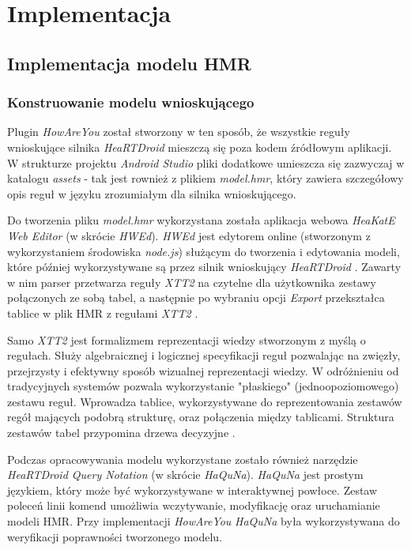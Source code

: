 \chapter{Implementacja}
\label{cha:implementacja}



\section{Implementacja modelu HMR}
\label{sec:implementacjaModeluHmr}

\subsection{Konstruowanie modelu wnioskującego}

Plugin \textit{HowAreYou} został stworzony w ten sposób, że wszystkie reguły wnioskujące silnika \textit{HeaRTDroid} mieszczą się poza kodem źródłowym aplikacji. W strukturze projektu \textit{Android Studio} pliki dodatkowe umieszcza się zazwyczaj w katalogu \textit{assets} - tak jest rownież z plikiem \textit{model.hmr}, który zawiera szczegółowy opis reguł w języku zrozumiałym dla silnika wnioskującego.

Do tworzenia pliku \textit{model.hmr} wykorzystana została aplikacja webowa \textit{HeaKatE Web Editor} (w skrócie \textit{HWEd}). \textit{HWEd} jest edytorem online (stworzonym z wykorzystaniem środowiska \textit{node.js}) służącym do tworzenia i edytowania modeli, które później wykorzystywane są przez silnik wnioskujący \textit{HeaRTDroid} \cite{heartdroid}. Zawarty w nim parser przetwarza reguły \textit{XTT2} na czytelne dla użytkownika zestawy połączonych ze sobą tabel, a następnie po wybraniu opcji \textit{Export} przekształca tablice w plik HMR z regułami \textit{XTT2} \cite{heartdroid}.

Samo \textit{XTT2} jest formalizmem reprezentacji wiedzy stworzonym z myślą o regułach. Służy algebraicznej i logicznej specyfikacji reguł pozwalając na zwięzły, przejrzysty i efektywny sposób wizualnej reprezentacji wiedzy. W odróżnieniu od tradycyjnych systemów pozwala wykorzystanie "płaskiego" (jednoopoziomowego) zestawu reguł. Wprowadza tablice, wykorzystywane do reprezentowania zestawów regół mających podobrą strukturę, oraz połączenia między tablicami. Struktura zestawów tabel przypomina drzewa decyzyjne \cite{AiWikiHekate}.

Podczas opracowywania modelu wykorzystane zostało również narzędzie \textit{HeaRTDroid Query Notation} (w skrócie \textit{HaQuNa}). \textit{HaQuNa} jest prostym językiem, który może być wykorzystywane w interaktywnej powłoce. Zestaw poleceń linii komend umożliwia wczytywanie, modyfikację oraz uruchamianie modeli HMR\cite{heartdroid}. Przy implementacji \textit{HowAreYou} \textit{HaQuNa} była wykorzystywana do weryfikacji poprawności tworzonego modelu.

